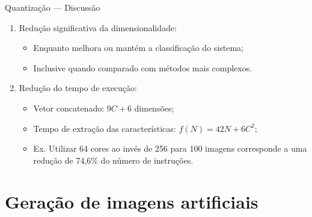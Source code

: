 \documentclass[10pt]{beamer}
\begin{document}
\begin{frame}{Quantização --- Discussão}
  \setlength\leftmargini{1em}
  \begin{block}{}
    \begin{enumerate}
      \item Redução significativa da dimensionalidade:
      \begin{itemize}
        \item Enquanto melhora ou mantém a classificação do sistema;
        \item Inclusive quando comparado com métodos mais complexos.
      \end{itemize}
      \item Redução do tempo de execução:
      \begin{itemize}
        \item Vetor concatenado: $9C+6$ dimensões;
        \item Tempo de extração das características: $f(N)=42N+6C^2$;
        \item Ex. Utilizar 64 cores ao invés de 256 para 100 imagens corresponde a uma redução de 74,6\% do número de instruções.
      \end{itemize}
    \end{enumerate}
  \end{block}
\end{frame}
\section{Geração de imagens artificiais}
\end{document}
